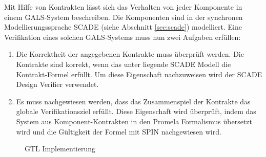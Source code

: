 Mit Hilfe von Kontrakten lässt sich das Verhalten von jeder Komponente in einem GALS-System beschreiben.
Die Komponenten sind in der synchronen Modellierungssprache SCADE (siehe Abschnitt \ref{sec:scade}) modelliert.
Eine Verifikation eines solchen GALS-Systems muss nun zwei Aufgaben erfüllen:
\begin{enumerate}
\item Die Korrektheit der angegebenen Kontrakte muss überprüft werden.
  Die Kontrakte sind korrekt, wenn das unter liegende SCADE Modell die Kontrakt-Formel erfüllt.
  Um diese Eigenschaft nachzuweisen wird der SCADE Design Verifier verwendet.
\item Es muss nachgewiesen werden, dass das Zusammenspiel der Kontrakte das globale Verifikationsziel erfüllt.
  Diese Eigenschaft wird überprüft, indem das System aus Komponent-Kontrakten in den Promela Formalismus übersetzt wird und die Gültigkeit der Formel mit SPIN nachgewiesen wird.
\end{enumerate}
\begin{figure}[h]
  \centering
  
  \caption{GTL Implementierung}
  \label{fig:gtl_implementation2}
\end{figure}
